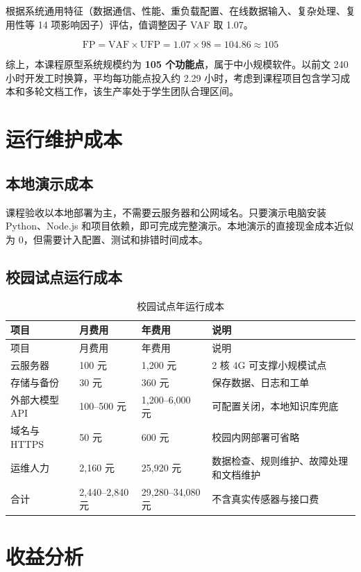 \documentclass[12pt,a4paper]{ctexart}
\begin{document}
根据系统通用特征（数据通信、性能、重负载配置、在线数据输入、复杂处理、复用性等 14 项影响因子）评估，值调整因子 VAF 取 1.07。

\[
\text{FP} = \text{VAF} \times \text{UFP} = 1.07 \times 98 = 104.86 \approx 105
\]

综上，本课程原型系统规模约为 \textbf{105 个功能点}，属于中小规模软件。以前文 240 小时开发工时换算，平均每功能点投入约 2.29 小时，考虑到课程项目包含学习成本和多轮文档工作，该生产率处于学生团队合理区间。

\section{运行维护成本}
\subsection{本地演示成本}
课程验收以本地部署为主，不需要云服务器和公网域名。只要演示电脑安装 Python、Node.js 和项目依赖，即可完成完整演示。本地演示的直接现金成本近似为 0，但需要计入配置、测试和排错时间成本。

\subsection{校园试点运行成本}
\begin{longtable}{p{4cm}p{2.8cm}p{2.8cm}p{4.4cm}}
\caption{校园试点年运行成本}\\
\toprule
项目 & 月费用 & 年费用 & 说明 \\
\midrule
\endfirsthead
\toprule
项目 & 月费用 & 年费用 & 说明 \\
\midrule
\endhead
云服务器 & 100 元 & 1,200 元 & 2 核 4G 可支撑小规模试点 \\
存储与备份 & 30 元 & 360 元 & 保存数据、日志和工单 \\
外部大模型 API & 100--500 元 & 1,200--6,000 元 & 可配置关闭，本地知识库兜底 \\
域名与 HTTPS & 50 元 & 600 元 & 校园内网部署可省略 \\
运维人力 & 2,160 元 & 25,920 元 & 数据检查、规则维护、故障处理和文档维护 \\
\midrule
合计 & 2,440--2,840 元 & 29,280--34,080 元 & 不含真实传感器与接口费 \\
\bottomrule
\end{longtable}

\section{收益分析}
\end{document}
